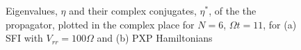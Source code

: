 \begin{figure}
  \centering
  \caption{Eigenvalues, $\eta$ and their complex conjugates, $\eta^*$,
    of the the propagator, plotted in the complex place for $N=6$,
    $\Omega t=11$, for (a) SFI with $V_{rr}=100\Omega$ and (b) PXP
    Hamiltonians}
\end{figure}


